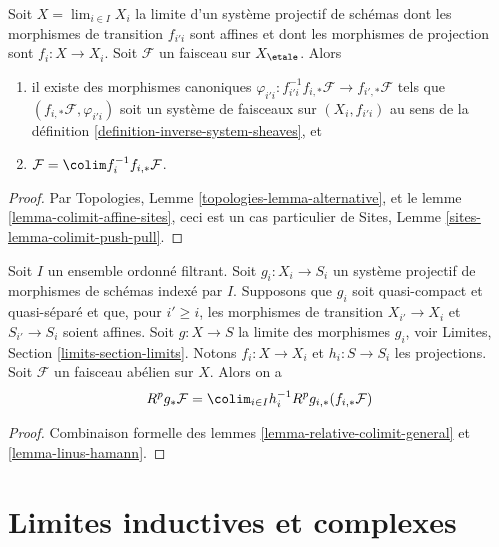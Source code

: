 \begin{lemma}
\label{lemma-linus-hamann}
Soit $X = \lim_{i \in I} X_i$ la limite d'un syst\`eme projectif de sch\'emas
dont les morphismes de transition $f_{i'i}$ sont affines et dont les morphismes de projection
sont $f_i : X \to X_i$. Soit $\mathcal{F}$ un faisceau sur $X_\etale$. Alors
\begin{enumerate}
\item il existe des morphismes canoniques
$\varphi_{i'i} : f_{i'i}^{-1}f_{i, *}\mathcal{F} \to f_{i', *}\mathcal{F}$
tels que $(f_{i, *}\mathcal{F}, \varphi_{i'i})$ soit un syst\`eme de
faisceaux sur $(X_i, f_{i'i})$ au sens de la
d\'efinition \ref{definition-inverse-system-sheaves}, et
\item $\mathcal{F} = \colim f_i^{-1}f_{i, *}\mathcal{F}$.
\end{enumerate}
\end{lemma}

\begin{proof}
Par Topologies, Lemme \ref{topologies-lemma-alternative}, et le
lemme \ref{lemma-colimit-affine-sites}, ceci est un cas particulier de
Sites, Lemme \ref{sites-lemma-colimit-push-pull}.
\end{proof}

\begin{lemma}
\label{lemma-compute-strangely}
Soit $I$ un ensemble ordonn\'e filtrant. Soit $g_i : X_i \to S_i$ un syst\`eme projectif de
morphismes de sch\'emas index\'e par $I$. Supposons que $g_i$ soit quasi-compact et
quasi-s\'epar\'e et que, pour $i' \geq i$, les morphismes de transition
$X_{i'} \to X_i$ et $S_{i'} \to S_i$ soient affines.
Soit $g : X \to S$ la limite des morphismes $g_i$, voir
Limites, Section \ref{limits-section-limits}.
Notons $f_i : X \to X_i$ et $h_i : S \to S_i$ les projections.
Soit $\mathcal{F}$ un faisceau ab\'elien sur $X$. Alors on a
$$
R^pg_*\mathcal{F} = \colim_{i \in I} h_i^{-1}R^pg_{i, *}(f_{i, *}\mathcal{F})
$$
\end{lemma}

\begin{proof}
Combinaison formelle des lemmes \ref{lemma-relative-colimit-general}
et \ref{lemma-linus-hamann}.
\end{proof}











\section{Limites inductives et complexes}
\label{section-colimit-complexes}

